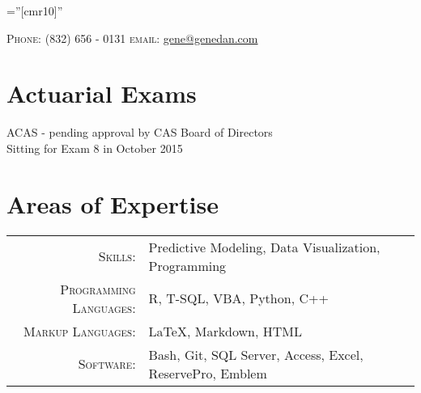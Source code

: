 \documentclass[10pt]{article} %
\begin{document}
\pagestyle{empty} %

\font\fb=''[cmr10]'' %


\par{\par} %

\begin{center}
\textsc{Phone:}  (832) 656 - 0131 \qquad
\textsc{email:}  \href{mailto:gene@genedan.com}{gene@genedan.com}
\end{center}



\section{Actuarial Exams}
ACAS - pending approval by CAS Board of Directors\\
Sitting for Exam 8 in October 2015

\section{Areas of Expertise}
\begin{tabular}{r|p{10cm}}
\textsc{Skills: } & Predictive Modeling, Data Visualization, Programming\\
\textsc{Programming Languages: } & R, T-SQL, VBA, Python, C++\\
\textsc{Markup Languages: } & \LaTeX, Markdown, HTML\\
\textsc{Software: } & Bash, Git, SQL Server, Access, Excel, ReservePro, Emblem\\
\end{tabular}

\end{document}
